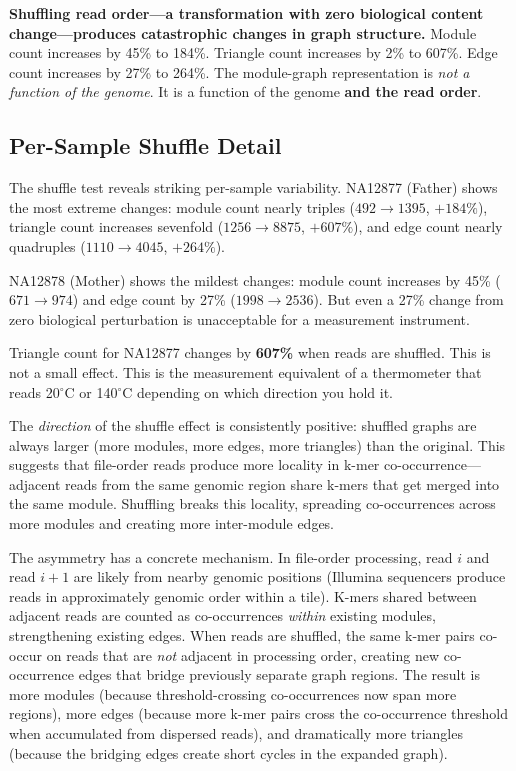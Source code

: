 \documentclass{../yalumba}
\begin{document}
\begin{keyfinding}
\textbf{Shuffling read order---a transformation with zero biological
content change---produces catastrophic changes in graph structure.}
Module count increases by 45\% to 184\%.  Triangle count increases by
2\% to 607\%.  Edge count increases by 27\% to 264\%.  The
module-graph representation is \emph{not a function of the genome}.  It
is a function of the genome \textbf{and the read order}.
\end{keyfinding}

\subsection{Per-Sample Shuffle Detail}

The shuffle test reveals striking per-sample variability.  NA12877
(Father) shows the most extreme changes: module count nearly triples
($492 \to 1395$, $+184\%$), triangle count increases sevenfold
($1256 \to 8875$, $+607\%$), and edge count nearly quadruples
($1110 \to 4045$, $+264\%$).

NA12878 (Mother) shows the mildest changes: module count increases by
45\% ($671 \to 974$) and edge count by 27\% ($1998 \to 2536$).  But
even a 27\% change from zero biological perturbation is unacceptable
for a measurement instrument.

\begin{pullquote}
Triangle count for NA12877 changes by \textbf{607\%} when reads are
shuffled.  This is not a small effect.  This is the measurement
equivalent of a thermometer that reads 20$^\circ$C or 140$^\circ$C
depending on which direction you hold it.
\end{pullquote}

The \emph{direction} of the shuffle effect is consistently positive:
shuffled graphs are always larger (more modules, more edges, more
triangles) than the original.  This suggests that file-order reads
produce more locality in k-mer co-occurrence---adjacent reads from the
same genomic region share k-mers that get merged into the same module.
Shuffling breaks this locality, spreading co-occurrences across more
modules and creating more inter-module edges.


The asymmetry has a concrete mechanism.  In file-order processing, read
$i$ and read $i+1$ are likely from nearby genomic positions (Illumina
sequencers produce reads in approximately genomic order within a tile).
K-mers shared between adjacent reads are counted as co-occurrences
\emph{within} existing modules, strengthening existing edges.  When
reads are shuffled, the same k-mer pairs co-occur on reads that are
\emph{not} adjacent in processing order, creating new co-occurrence
edges that bridge previously separate graph regions.  The result is more
modules (because threshold-crossing co-occurrences now span more
regions), more edges (because more k-mer pairs cross the co-occurrence
threshold when accumulated from dispersed reads), and dramatically more
triangles (because the bridging edges create short cycles in the
expanded graph).
\end{document}
